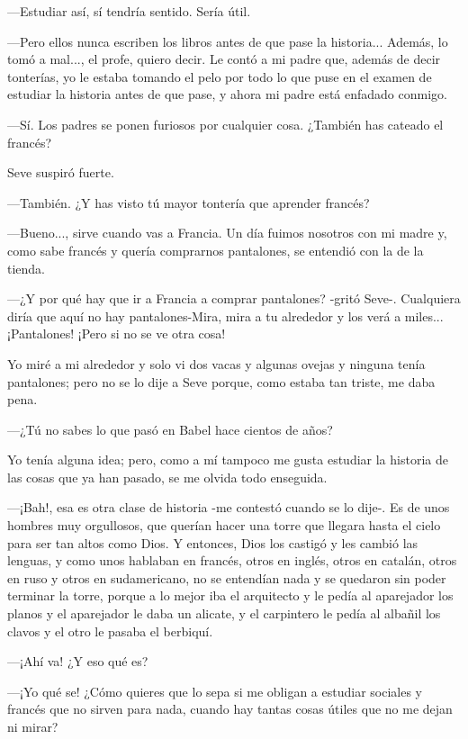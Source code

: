 \documentclass{barcodevapor3pags}
\begin{document}
---Estudiar así, sí tendría sentido. Sería útil.~

---Pero ellos nunca escriben los libros antes de que pase la historia...
Además, lo tomó a mal..., el profe, quiero decir. Le contó a mi padre
que, además de decir tonterías, yo le estaba tomando el pelo por todo lo
que puse en el examen de estudiar la historia antes de que pase, y ahora
mi padre está enfadado conmigo.~


---Sí. Los padres se ponen furiosos por cualquier cosa. ¿También has
cateado el francés?~


Seve suspiró fuerte.~

---También. ¿Y has visto tú mayor tontería que aprender francés?~

---Bueno..., sirve cuando vas a Francia. Un día fuimos nosotros con mi
madre y, como sabe francés y quería comprarnos pantalones, se entendió
con la de la tienda.~

---¿Y por qué hay que ir a Francia a comprar pantalones? -gritó Seve-.
Cualquiera diría que aquí no hay pantalones-Mira, mira a tu alrededor y
los verá a miles... ¡Pantalones! ¡Pero si no se ve otra cosa!~

Yo miré a mi alrededor y solo vi dos vacas y algunas ovejas y ninguna
tenía pantalones; pero no se lo dije a Seve porque, como estaba tan
triste, me daba pena.~

---¿Tú no sabes lo que pasó en Babel hace cientos de años?~

Yo tenía alguna idea; pero, como a mí tampoco me gusta estudiar la
historia de las cosas que ya han pasado, se me olvida todo enseguida.~

---¡Bah!, esa es otra clase de historia -me contestó cuando se lo dije-.
Es de unos hombres muy orgullosos, que querían hacer una torre que
llegara hasta el cielo para ser tan altos como Dios. Y entonces, Dios
los castigó y les cambió las lenguas, y como unos hablaban en francés,
otros en inglés, otros en catalán, otros en ruso y otros en
sudamericano, no se entendían nada y se quedaron sin poder terminar la
torre, porque a lo mejor iba el arquitecto y le pedía al aparejador los
planos y el aparejador le daba un alicate, y el carpintero le pedía al
albañil los clavos y el otro le pasaba el berbiquí.~

---¡Ahí va! ¿Y eso qué es?~

---¡Yo qué se! ¿Cómo quieres que lo sepa si me obligan a estudiar
sociales y francés que no sirven para nada, cuando hay tantas cosas
útiles que no me dejan ni mirar?~
\end{document}
